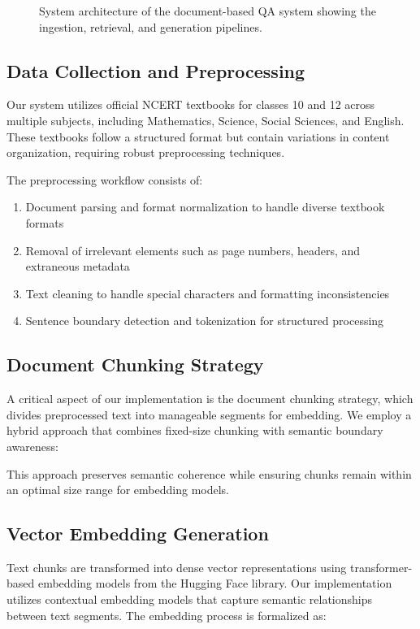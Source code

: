 \documentclass[10pt,conference]{IEEEtran}
\begin{document}
\begin{figure}[ht]
    \centering
    \caption{System architecture of the document-based QA system showing the ingestion, retrieval, and generation pipelines.}
    \label{fig:architecture}
\end{figure}

\subsection{Data Collection and Preprocessing}
Our system utilizes official NCERT textbooks for classes 10 and 12 across multiple subjects, including Mathematics, Science, Social Sciences, and English. These textbooks follow a structured format but contain variations in content organization, requiring robust preprocessing techniques.

The preprocessing workflow consists of:
\begin{enumerate}
    \item Document parsing and format normalization to handle diverse textbook formats
    \item Removal of irrelevant elements such as page numbers, headers, and extraneous metadata
    \item Text cleaning to handle special characters and formatting inconsistencies
    \item Sentence boundary detection and tokenization for structured processing
\end{enumerate}

\subsection{Document Chunking Strategy}
A critical aspect of our implementation is the document chunking strategy, which divides preprocessed text into manageable segments for embedding. We employ a hybrid approach that combines fixed-size chunking with semantic boundary awareness:


This approach preserves semantic coherence while ensuring chunks remain within an optimal size range for embedding models.

\subsection{Vector Embedding Generation}
Text chunks are transformed into dense vector representations using transformer-based embedding models from the Hugging Face library. Our implementation utilizes contextual embedding models that capture semantic relationships between text segments. The embedding process is formalized as:
\end{document}
